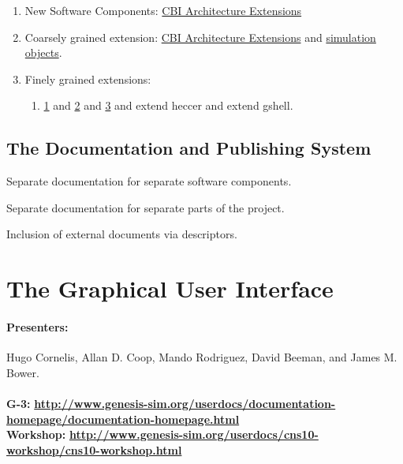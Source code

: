 \documentclass[12pt]{article}
\begin{document}
\begin{enumerate}
\item New Software Components:
  \href{../genesis-addto-component-developerpackage/genesis-addto-component-developerpackage.tex}{CBI
    Architecture Extensions}
\item Coarsely grained extension:
  \href{../genesis-add-feature-ssp/genesis-add-feature-ssp.tex}{CBI
    Architecture Extensions} and
  \href{../genesis-add-object-solver/genesis-add-object-solver.tex}{simulation
    objects}.
\item Finely grained extensions:
  \begin{enumerate}
  \item
    \href{../genesis-extend-model-container/genesis-extend-model-container.tex}{1}
    and
    \href{../genesis-extend-model-container-detail/genesis-extend-model-container-detail.tex}{2}
    and
    \href{../genesis-extend-functionality/genesis-extend-functionality.tex}{3}
    and extend heccer and extend gshell.
  \end{enumerate}
\end{enumerate}



\subsection{The Documentation and Publishing System}

Separate documentation for separate software components.

Separate documentation for separate parts of the project.

Inclusion of external documents via descriptors.



\section{The Graphical User Interface}


\paragraph*{Presenters:}
Hugo Cornelis, Allan D. Coop, Mando Rodriguez, David Beeman, and James M. Bower. \\

 \\
{\bf G-3:} {\scriptsize \href{http://www.genesis-sim.org/userdocs/documentation-homepage/documentation-homepage.html}{\bf http://www.genesis-sim.org/userdocs/documentation-homepage/documentation-homepage.html}} \\
{\bf Workshop:} {\scriptsize \href{http://www.genesis-sim.org/userdocs/cns10-workshop/cns10-workshop.html}{\bf http://www.genesis-sim.org/userdocs/cns10-workshop/cns10-workshop.html}}
\end{document}
